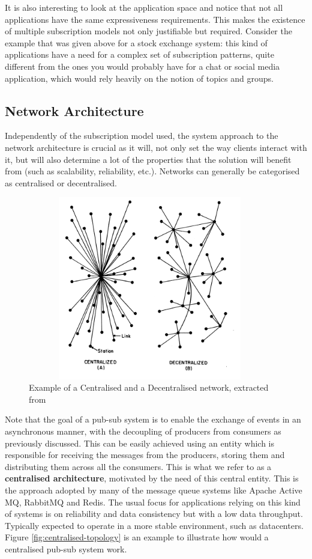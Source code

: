 It is also interesting to look at the application space and notice that
not all applications have the same expressiveness requirements. This
makes the existence of multiple subscription models not only justifiable
but required. Consider the example that was given above for a stock exchange
system: this kind of applications have a need for a complex set of
subscription patterns, quite different from the ones you would probably
have for a chat or social media application, which would rely heavily on
the notion of topics and groups.

\subsection{Network Architecture}\label{network-architecture}

Independently of the subscription model used, the system approach to the
network architecture is crucial as it will, not only set the way clients
interact with it, but will also determine a lot of the properties that
the solution will benefit from (such as scalability, reliability, etc.). Networks
can generally be categorised as centralised or decentralised.

\begin{figure}[hb!]
  \centering
  \includegraphics[max height=8cm,max width=0.95\textwidth]{img/network-archs.png}
  \caption{Example of a Centralised and a Decentralised network, extracted from \cite{Baran1964}}
  \label{fig:network-archs}
\end{figure}

Note that the goal of a pub-sub system is to enable the exchange of events in
an asynchronous manner, with the decoupling of producers from consumers as
previously discussed. This can be easily achieved using an entity which is
responsible for receiving the messages from the producers, storing them and
distributing them across all the consumers. This is what we refer to as a
\textbf{centralised architecture}, motivated by the need of this central
entity. This is the approach adopted by many of the message queue systems like
Apache Active MQ, RabbitMQ and Redis. The usual focus for applications relying
on this kind of systems is on reliability and data consistency but with a low
data throughput. Typically expected to operate in a more stable environment,
such as datacenters. Figure \ref{fig:centralised-topology} is an example to
illustrate how would a centralised pub-sub system work.

